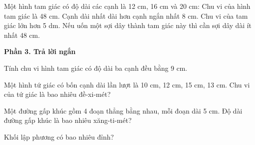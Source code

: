 \begin{ex} %
Một hình tam giác có độ dài các cạnh là 12 cm, 16 cm và 20 cm:
\choiceTF
{\True Chu vi của hình tam giác là 48 cm.}
{\True Cạnh dài nhất dài hơn cạnh ngắn nhất 8 cm.}
{Chu vi của tam giác lớn hơn 5 dm.}
{\True Nếu uốn một sợi dây thành tam giác này thì cần sợi dây dài ít nhất 48 cm.}
\end{ex}

\textbf{Phần 3. Trả lời ngắn}

\begin{ex} %
Tính chu vi hình tam giác có độ dài ba cạnh đều bằng 9 cm.
\end{ex}

\begin{ex} %
Một hình tứ giác có bốn cạnh dài lần lượt là 10 cm, 12 cm, 15 cm, 13 cm. Chu vi của tứ giác là bao nhiêu đề-xi-mét?
\end{ex}

\begin{ex} %
Một đường gấp khúc gồm 4 đoạn thẳng bằng nhau, mỗi đoạn dài 5 cm. Độ dài đường gấp khúc là bao nhiêu xăng-ti-mét?
\end{ex}

\begin{ex} %
Khối lập phương có bao nhiêu đỉnh?
\end{ex}

